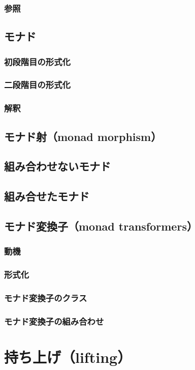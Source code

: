 \documentclass[11pt, oneside]{jsarticle}   	%
\begin{document}
\subsubsection{ 参照 }
\subsection{ モナド }
\subsubsection{ 初段階目の形式化 }
\subsubsection{ 二段階目の形式化 }
\subsubsection{ 解釈 }
\subsection{ モナド射（monad morphism） }
\subsection{ 組み合わせないモナド }
\subsection{ 組み合せたモナド }
\subsection{ モナド変換子（monad transformers） }
\subsubsection{  動機 }
\subsubsection{  形式化 }
\subsubsection{ モナド変換子のクラス }
\subsubsection{ モナド変換子の組み合わせ }
\section{ 持ち上げ（lifting）}
\end{document}
